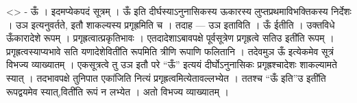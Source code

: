 \textless{}\textgreater{} - ऊँ । इदमप्येकपदं सूत्रम् । ऊँ इति
दीर्घस्याऽनुनासिकस्य ऊकारस्य लुप्तप्रथमाविभक्तिकस्य निर्देशः । उञ
इत्यनुवर्तते, इतौ शाकल्यस्य प्रगृह्रमिति च । तदाह --- उञ इताविति । ऊँ
ईतीति । उक्तविधे ऊँकारादेशे रूपम् । प्रगृह्रत्वात्प्रकृतिभावः ।
एतदादेशाऽबावपक्षे पूर्वसूत्रेण प्रगृह्रत्वे सतिउ इती॑ति रूपम् ।
प्रगृह्रत्वस्याप्यभावे सति यणादेशेविती॑ति रूपमिति त्रीणि रूपाणि फलितानि
। तदेवमुञ ऊँ इत्येकमेव सूत्रं विभज्य व्याख्यातम् । एकसूत्रत्वे तु उञ इतौ
परे ``ऊँ'' इत्ययं दीर्घोऽनुनासिकः प्रगृह्रश्चादेशः शाकल्यामते स्यात् ।
तदभावपक्षे तुनिपात एका॑जिति नित्यं प्रगृह्रत्वमित्येतावल्लभ्येत । ततश्च
``ऊँ इति''उ इती॑ति रूपद्वयमेव स्यात्,विती॑ति रूपं न लभ्येत । अतो विभज्य
व्याख्यातम् ।

